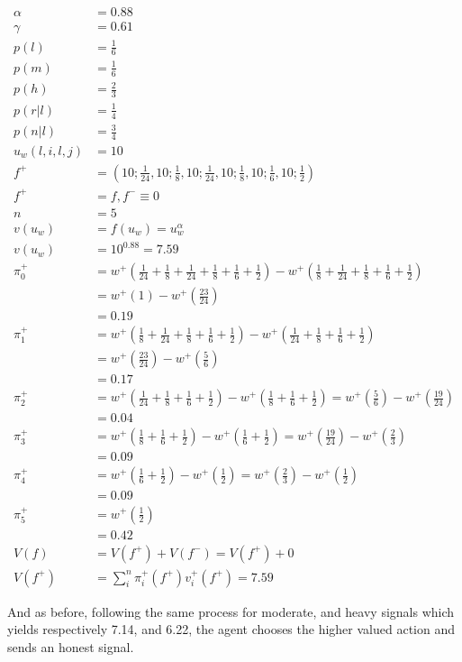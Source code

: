 \begin{align*}
\alpha &= 0.88\\
\gamma &= 0.61\\
p(l) &= \frac{1}{6}\\
p(m) &= \frac{1}{6}\\
p(h) &= \frac{2}{3}\\
p(r | l) &= \frac{1}{4}\\
p(n | l) &= \frac{3}{4}\\
u_{w}(l, i, l, j) &= 10\\
f^{+}&=(10;\frac{1}{24},10;\frac{1}{8},10;\frac{1}{24},10;\frac{1}{8},10;\frac{1}{6},10;\frac{1}{2})\\
f^{+}&=f,f^{-}\equiv0\\
n &= 5\\
v(u_{w}) &= f(u_{w}) = u_{w}^\alpha\\
v(u_{w}) &= 10^{0.88} = 7.59\\
\pi_{0}^{+}&=w^{+}(\frac{1}{24} + \frac{1}{8} + \frac{1}{24} + \frac{1}{8} + \frac{1}{6} + \frac{1}{2}) - w^{+}(\frac{1}{8} + \frac{1}{24} + \frac{1}{8} + \frac{1}{6} + \frac{1}{2})\\
&=w^{+}(1) - w^{+}(\frac{23}{24})\\
&=0.19\\
\pi_{1}^{+}&=w^{+}(\frac{1}{8} + \frac{1}{24} + \frac{1}{8} + \frac{1}{6} + \frac{1}{2}) - w^{+}(\frac{1}{24} + \frac{1}{8} + \frac{1}{6} + \frac{1}{2})\\
&=w^{+}(\frac{23}{24}) - w^{+}(\frac{5}{6})\\
&= 0.17\\
\pi_{2}^{+}&=w^{+}(\frac{1}{24} + \frac{1}{8} + \frac{1}{6} + \frac{1}{2}) - w^{+}(\frac{1}{8} + \frac{1}{6} + \frac{1}{2})=w^{+}(\frac{5}{6}) - w^{+}(\frac{19}{24})\\
&= 0.04\\
\pi_{3}^{+}&=w^{+}(\frac{1}{8} + \frac{1}{6} + \frac{1}{2}) - w^{+}(\frac{1}{6} + \frac{1}{2})=w^{+}(\frac{19}{24}) - w^{+}(\frac{2}{3})\\
&= 0.09\\
\pi_{4}^{+}&=w^{+}(\frac{1}{6} + \frac{1}{2}) - w^{+}(\frac{1}{2})=w^{+}(\frac{2}{3}) - w^{+}(\frac{1}{2})\\
&= 0.09\\
\pi_{5}^{+}&=w^{+}(\frac{1}{2})\\
&= 0.42\\
V(f) &= V(f^{+}) + V(f^{-}) = V(f^{+}) + 0\\
V(f^{+}) &= \sum_{i}^{n}\pi_{i}^{+}(f^{+})v_{i}^{+}(f^{+}) = 7.59
\end{align*}


And as before, following the same process for moderate, and heavy signals which yields respectively 7.14, and 6.22, the agent chooses the higher valued action and sends an honest signal.